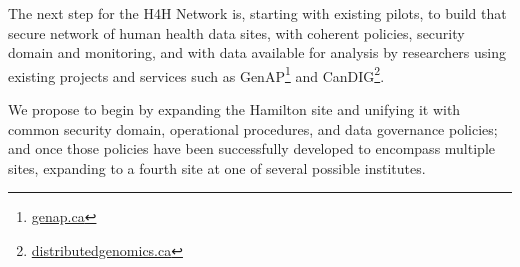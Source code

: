 \documentclass[twoside,symmetric,sfsidenotes,notoc]{tufte-book}
\begin{document}
The next step for the H4H Network is, starting with existing pilots, to build 
that secure network of human health data sites, with coherent policies, security 
domain and monitoring, and with data available for analysis by researchers using
existing projects and services such as GenAP\footnote{\href{https://genap.ca}{genap.ca}}
and CanDIG\footnote{\href{https://www.distributedgenomics.ca}{distributedgenomics.ca}}.

We propose to begin by expanding the Hamilton site and unifying it with common
security domain, operational procedures, and data governance policies; and once those
policies have been successfully developed to encompass multiple sites, expanding 
to a fourth site at one of several possible institutes.


\backmatter





\printindex
\end{document}
